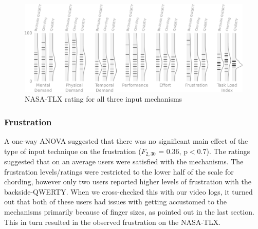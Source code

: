 \begin{figure}
    \includegraphics[width=\textwidth]{Figures/hash_and_densities_index.pdf} 
    \caption{NASA-TLX rating for all three input mechanisms}
    \label{fig:tlx-ratings}
\end{figure}


\subsubsection{Frustration}

A one-way ANOVA suggested that there was no significant main effect of the type of input technique on the frustration ($F_{2,30}$ = 0.36, p$<$0.7). The ratings suggested that on an average users were satisfied with the mechanisms. The frustration levels/ratings were restricted to the lower half of the scale for chording, however only two users reported higher levels of frustration with the backside-QWERTY. When we cross-checked this with our video logs, it turned out that both of these users had issues with getting accustomed to the mechanisms primarily because of finger sizes, as pointed out in the last section. This in turn resulted in the observed frustration on the NASA-TLX.

